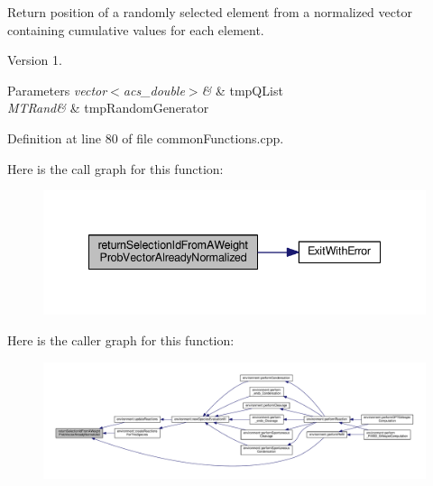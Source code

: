 Return position of a randomly selected element from a normalized vector containing cumulative values for each element. 

\begin{DoxyVersion}{Version}
1. 
\end{DoxyVersion}

\begin{DoxyParams}{Parameters}
{\em vector$<$acs\-\_\-double$>$\&} & tmp\-Q\-List \\
\hline
{\em M\-T\-Rand\&} & tmp\-Random\-Generator \\
\hline
\end{DoxyParams}


Definition at line 80 of file common\-Functions.\-cpp.



Here is the call graph for this function\-:\nopagebreak
\begin{figure}[H]
\begin{center}
\leavevmode
\includegraphics[width=338pt]{a00070_a4135ff15fd24eb8fbfee3d00e1cfbf20_cgraph}
\end{center}
\end{figure}




Here is the caller graph for this function\-:\nopagebreak
\begin{figure}[H]
\begin{center}
\leavevmode
\includegraphics[width=350pt]{a00070_a4135ff15fd24eb8fbfee3d00e1cfbf20_icgraph}
\end{center}
\end{figure}


